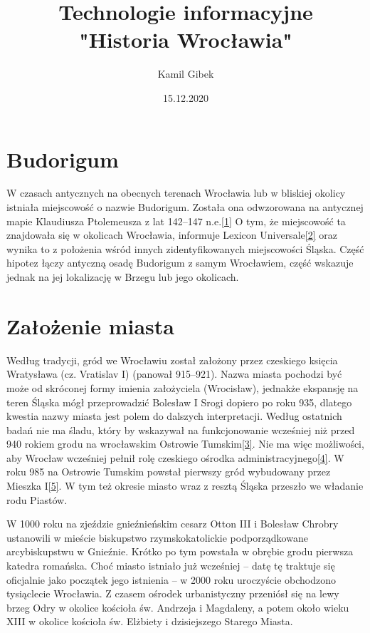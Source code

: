 \documentclass{article}
\title{Technologie informacyjne\\ "Historia Wrocławia"}
\author{Kamil Gibek}
\date{15.12.2020}
\begin{document}
\maketitle
\tableofcontents
\newpage
\section{Budorigum}
W czasach antycznych na obecnych terenach Wrocławia lub w bliskiej okolicy istniała miejscowość o nazwie Budorigum. Została ona odwzorowana na antycznej mapie Klaudiusza Ptolemeusza z lat 142–147 n.e.\hyperref[1]{[1]} O tym, że miejscowość ta znajdowała się w okolicach Wrocławia, informuje Lexicon Universale\hyperref[2]{[2]} oraz wynika to z położenia wśród innych zidentyfikowanych miejscowości Śląska. Część hipotez łączy antyczną osadę Budorigum z samym Wrocławiem, część wskazuje jednak na jej lokalizację w Brzegu lub jego okolicach.

\section{Założenie miasta}
Według tradycji, gród we Wrocławiu został założony przez czeskiego księcia Wratysława (cz. Vratislav I) (panował 915–921). Nazwa miasta pochodzi być może od skróconej formy imienia założyciela (Wrocisław), jednakże ekspansję na teren Śląska mógł przeprowadzić Bolesław I Srogi dopiero po roku 935, dlatego kwestia nazwy miasta jest polem do dalszych interpretacji. Według ostatnich badań nie ma śladu, który by wskazywał na funkcjonowanie wcześniej niż przed 940 rokiem grodu na wrocławskim Ostrowie Tumskim\hyperref[3]{[3]}. Nie ma więc możliwości, aby Wrocław wcześniej pełnił rolę czeskiego ośrodka administracyjnego\hyperref[4]{[4]}. W roku 985 na Ostrowie Tumskim powstał pierwszy gród wybudowany przez Mieszka I\hyperref[5]{[5]}. W tym też okresie miasto wraz z resztą Śląska przeszło we władanie rodu Piastów.

W 1000 roku na zjeździe gnieźnieńskim cesarz Otton III i Bolesław Chrobry ustanowili w mieście biskupstwo rzymskokatolickie podporządkowane arcybiskupstwu w Gnieźnie. Krótko po tym powstała w obrębie grodu pierwsza katedra romańska. Choć miasto istniało już wcześniej – datę tę traktuje się oficjalnie jako początek jego istnienia – w 2000 roku uroczyście obchodzono tysiąclecie Wrocławia. Z czasem ośrodek urbanistyczny przeniósł się na lewy brzeg Odry w okolice kościoła św. Andrzeja i Magdaleny, a potem około wieku XIII w okolice kościoła św. Elżbiety i dzisiejszego Starego Miasta.
\end{document}
